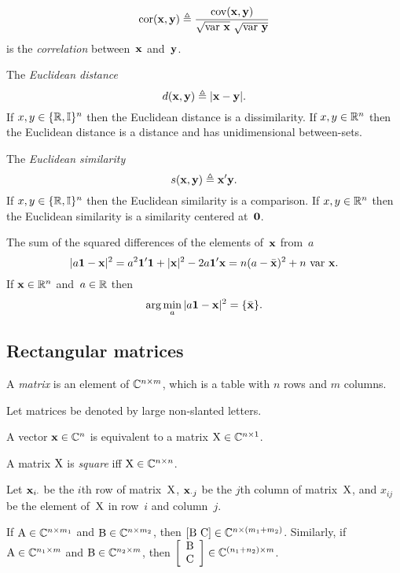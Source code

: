 \documentclass[10pt,a4paper]{article}
\theoremstyle{plain} \newtheorem{Lem}{Lemma}
\begin{document}
$$ \mathrm {cor} (\mathbf x, \mathbf y) \triangleq \frac {\mathrm {cov} (\mathbf x, \mathbf y)} {\sqrt{\mathrm {var} \  \mathbf x} \ \sqrt{\mathrm {var} \  \mathbf y}} $$ 
is the {\em correlation} between~$\mathbf x$ and~$\mathbf y$.

The {\em Euclidean distance} $$d(\mathbf x, \mathbf y) \triangleq |\mathbf x - \mathbf y|.$$
If $x,y \in \{\mathbb R,\mathbb I\}^n$ then the Euclidean distance is a dissimilarity.
If $x,y \in \mathbb R^n$ then the Euclidean distance is a distance and has unidimensional between-sets.

The {\em Euclidean similarity} $$s(\mathbf x, \mathbf y) \triangleq \mathbf x' \mathbf y.$$
If $x,y \in \{\mathbb R,\mathbb I\}^n$ then the Euclidean similarity is a comparison.
If $x,y \in \mathbb R^n$ then the Euclidean similarity is a similarity centered at~$\mathbf 0$.

The sum of the squared differences of the elements of~$\mathbf x$ from~$a$
\begin{equation} \label{sqDiff}
|a \mathbf 1 - \mathbf x|^2 = a^2 \mathbf 1' \mathbf 1 + |\mathbf x|^2 - 2a\mathbf 1' \mathbf x = n (a - \bar {\mathbf x})^2 + n \ \mathrm {var} \  \mathbf x.
\end{equation}
If $\mathbf x \in \mathbb R^n$ and~$a \in \mathbb R$ then
\begin{equation} \label{centerL2}
  \arg \min_a |a \mathbf 1 - \mathbf x|^2 = \{\bar {\mathbf x} \}.
\end{equation}






\subsection{Rectangular matrices}

A {\em matrix} is an element of $\mathbb C^{n \times m}$, which is a table with $n$ rows and $m$ columns.

Let matrices be denoted by large non-slanted letters.

A vector $\mathbf x \in \mathbb C^n$ is equivalent to a matrix $\mathrm X \in \mathbb C^{n \times 1}$.

A matrix $\mathrm X$ is {\em square} iff $\mathrm X \in \mathbb C^{n \times n}$.

Let $\mathbf x_{i \cdot }$ be the $i$th row of matrix~$\mathrm X$,
$\mathbf x_{\cdot j}$ be the $j$th column of matrix~$\mathrm X$,
and $x_{ij}$ be the element of~$\mathrm X$ in row~$i$ and column~$j$.

If $\mathrm A \in \mathbb C^{n \times m_1}$ and $\mathrm B \in \mathbb C^{n \times m_2}$, then $[\mathrm B \ \mathrm C] \in \mathbb C^{n \times (m_1 + m_2)}$.
Similarly, 
if $\mathrm A \in \mathbb C^{n_1 \times m}$ and $\mathrm B \in \mathbb C^{n_2 \times m}$, then $\left[ \begin{array}{c} \mathrm B \\ \mathrm C \end{array} \right] \in \mathbb C^{(n_1 + n_2) \times m}$.
\end{document}
